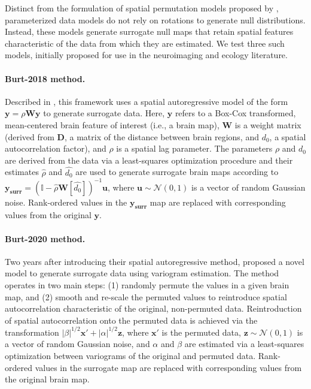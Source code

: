 \documentclass[12pt,aps,pra,reprint,showkeys]{revtex4-1}
\begin{document}
Distinct from the formulation of spatial permutation models proposed by \citet{alexanderbloch2018neuroimage}, parameterized data models do not rely on rotations to generate null distributions.
Instead, these models generate surrogate null maps that retain spatial features characteristic of the data from which they are estimated.
We test three such models, initially proposed for use in the neuroimaging \citep{burt2018natneuro, burt2020neuroimage} and ecology \citep{wagner2015generating} literature.

\paragraph*{Burt-2018 method.}

Described in \citet{burt2018natneuro}, this framework uses a spatial autoregressive model of the form $\mathbf{y} = \rho \mathbf{W} \mathbf{y}$ to generate surrogate data.
Here, $\mathbf{y}$ refers to a Box-Cox transformed, mean-centered brain feature of interest (i.e., a brain map), $\mathbf{W}$ is a weight matrix (derived from $\mathbf{D}$, a matrix of the distance between brain regions, and $d_{0}$, a spatial autocorrelation factor), and $\rho$ is a spatial lag parameter.
The parameters $\rho$ and $d_{0}$ are derived from the data via a least-squares optimization procedure and their estimates $\hat{\rho}$ and $\hat{d_{0}}$ are used to generate surrogate brain maps according to $\mathbf{y_{surr}} = (\mathbb{I} - \hat{\rho} \mathbf{W}[\hat{d_{0}}])^{-1} \mathbf{u}$, where $\mathbf{u} \sim \mathcal{N}(0,1)$ is a vector of random Gaussian noise.
Rank-ordered values in the $\mathbf{y_{surr}}$ map are replaced with corresponding values from the original $\mathbf{y}$.

\paragraph*{Burt-2020 method.}

Two years after introducing their spatial autoregressive method, \citet{burt2020neuroimage} proposed a novel model to generate surrogate data using variogram estimation.
The method operates in two main steps: (1) randomly permute the values in a given brain map, and (2) smooth and re-scale the permuted values to reintroduce spatial autocorrelation characteristic of the original, non-permuted data.
Reintroduction of spatial autocorrelation onto the permuted data is achieved via the transformation $|\beta|^{1/2} \mathbf{x'} + |\alpha|^{1/2} \mathbf{z}$, where $\mathbf{x'}$ is the permuted data, $\mathbf{z} \sim \mathcal{N}(0,1)$ is a vector of random Gaussian noise, and $\alpha$ and $\beta$ are estimated via a least-squares optimization between variograms of the original and permuted data.
Rank-ordered values in the surrogate map are replaced with corresponding values from the original brain map.
\end{document}

